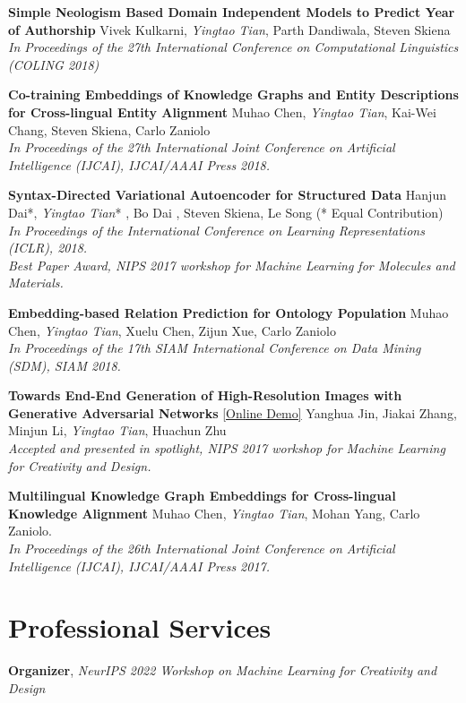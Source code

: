 \documentclass[line,margin]{cv}
\newcommand{\myemph}{\textbf}
\begin{document}
\begin{resume}
	{\bf Simple Neologism Based Domain Independent Models to Predict Year of Authorship}
	 Vivek Kulkarni, \emph{Yingtao Tian}, Parth Dandiwala, Steven Skiena \\
	\emph{In Proceedings of the 27th International Conference on Computational Linguistics (COLING 2018)}

	{\bf Co-training Embeddings of Knowledge Graphs and Entity Descriptions for Cross-lingual Entity Alignment}
	Muhao Chen, \emph{Yingtao Tian}, Kai-Wei Chang, Steven Skiena, Carlo Zaniolo\\
	\emph{In Proceedings of the 27th International Joint Conference on Artificial Intelligence (IJCAI), IJCAI/AAAI Press 2018.}
	
  {\bf Syntax-Directed Variational Autoencoder for Structured Data}
  Hanjun Dai*, \emph{Yingtao Tian}* , Bo Dai , Steven Skiena, Le Song (* Equal Contribution)\\
  \emph{In Proceedings of the International Conference on Learning Representations (ICLR), 2018. \\
  Best Paper Award, NIPS 2017 workshop for Machine Learning for Molecules and Materials.}
  
	{\bf Embedding-based Relation Prediction for Ontology Population}
	Muhao Chen, \emph{Yingtao Tian}, Xuelu Chen, Zijun Xue, Carlo Zaniolo\\
	\emph{In Proceedings of the 17th SIAM International Conference on Data Mining (SDM), SIAM 2018.}

  {\bf Towards End-End Generation of High-Resolution Images with Generative Adversarial Networks}
  \href{http://make.girls.moe/#/}{[Online Demo]}
  Yanghua Jin, Jiakai Zhang, Minjun Li, \emph{Yingtao Tian}, Huachun Zhu\\
  \emph{Accepted and presented in spotlight, NIPS 2017 workshop for Machine Learning for Creativity and Design.}

  {\bf Multilingual Knowledge Graph Embeddings for Cross-lingual Knowledge Alignment}
  Muhao Chen, \emph{Yingtao Tian}, Mohan Yang, Carlo Zaniolo.\\
  \emph{In Proceedings of the 26th International Joint Conference on Artificial Intelligence (IJCAI), IJCAI/AAAI Press 2017.}

\section{Professional Services }
  \myemph{Organizer}, \emph{NeurIPS 2022 Workshop on Machine Learning for Creativity and Design}


\end{resume}
\end{document}

